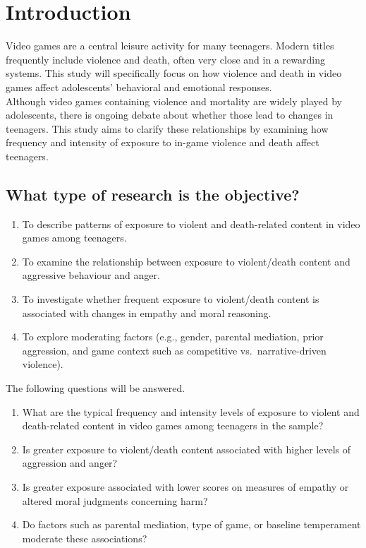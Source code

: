 \section{Introduction}
Video games are a central leisure activity for many teenagers. Modern titles frequently include
violence and death, often very close and in a rewarding systems. This study will specifically focus on how violence and death in video games affect adolescents' 
behavioral and emotional responses.
\\
Although video games containing violence and mortality are widely played by adolescents, there is ongoing debate about whether those lead to changes in teenagers. 
This study aims to clarify these relationships by examining how frequency and intensity of exposure to in-game violence and death affect teenagers.


\subsection{What type of research is the objective?}

\begin{enumerate}

    \item To describe patterns of exposure to violent and death-related content in video games among teenagers.
    \item To examine the relationship between exposure to violent/death content and aggressive behaviour and anger.
    \item To investigate whether frequent exposure to violent/death content is associated with changes in empathy and moral reasoning.
    \item To explore moderating factors (e.g., gender, parental mediation, prior aggression, and game context such as competitive vs.\ narrative-driven violence).
\end{enumerate}
The following questions will be answered.
\begin{enumerate}
    \item What are the typical frequency and intensity levels of exposure to violent and death-related content in video games among teenagers in the sample?
    \item Is greater exposure to violent/death content associated with higher levels of aggression and anger?
    \item Is greater exposure associated with lower scores on measures of empathy or altered moral judgments concerning harm?
    \item Do factors such as parental mediation, type of game, or baseline temperament moderate these associations?
\end{enumerate}



